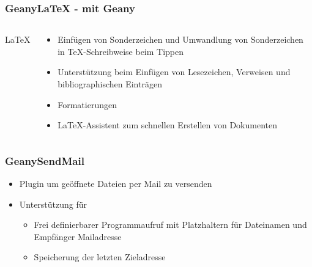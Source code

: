 
\begin{frame}
	\frametitle{GeanyLaTeX - \LaTeXe mit Geany}
	\begin{columns}[c]
		\column[c]{2cm}
			\huge \LaTeX
		\column{8cm}
			\begin{block}{}
				\begin{itemize}
					\item Einfügen von Sonderzeichen und Umwandlung von
						  Sonderzeichen in \TeX-Schreibweise beim Tippen
					\item Unterstützung beim Einfügen von Lesezeichen,
						  Verweisen und bibliographischen Einträgen
					\item Formatierungen
					\item \LaTeX-Assistent zum schnellen Erstellen von
						  Dokumenten
				\end{itemize}
			\end{block}
	\end{columns}
\end{frame}

\begin{frame}
	\frametitle{GeanySendMail}
	\begin{block}{}
		\begin{itemize}
			\item Plugin um geöffnete Dateien per Mail zu versenden
			\item Unterstützung für
				\begin{itemize}
					\item Frei definierbarer Programmaufruf mit Platzhaltern
						  für Dateinamen und Empfänger Mailadresse
					\item Speicherung der letzten Zieladresse
				\end{itemize}
		\end{itemize}
	\end{block}
\end{frame}



